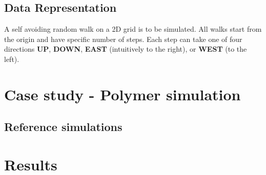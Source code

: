 \documentclass[11pt]{article}
\begin{document}
\subsection{Data Representation}
A self avoiding random walk on a 2D grid is to be simulated. All walks start from the origin and have specific number of steps. Each step can take one of four directions \textbf{UP}, \textbf{DOWN}, \textbf{EAST} (intuitively to the right),  or \textbf{WEST} (to the left).
\section{Case study - Polymer simulation}
\subsection{Reference simulations}


\section{Results}


\end{document}
